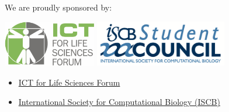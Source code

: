 \documentclass[12pt,]{article}
\begin{document}
We are proudly sponsored by:

 \vspace{2ex}
\begin{minipage}[c]{0.5\columnwidth}
    \centering
    \includegraphics[height=20mm]{./images/ICT-for-Life-Sciences-Forum-logo.png}\quad
    \includegraphics[height=20mm]{./images/ISCBSC-logo.png}
\end{minipage}
\begin{minipage}[c]{0.5\columnwidth}
\begin{itemize}
    \itemsep1pt\parskip0pt
    \item
      \href{http://www.ict4lifesciences.org.au}{ICT for Life Sciences Forum}
    \item
      \href{http://www.iscb.org}{International Society for Computational
      Biology (ISCB)}
    \end{itemize}
\end{minipage}


\vfill
\end{document}

